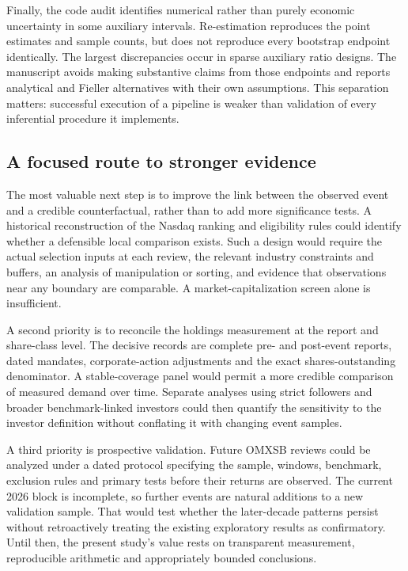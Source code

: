 Finally, the code audit identifies numerical rather than purely economic uncertainty in some auxiliary intervals. Re-estimation reproduces the point estimates and sample counts, but does not reproduce every bootstrap endpoint identically. The largest discrepancies occur in sparse auxiliary ratio designs. The manuscript avoids making substantive claims from those endpoints and reports analytical and Fieller alternatives with their own assumptions. This separation matters: successful execution of a pipeline is weaker than validation of every inferential procedure it implements.

\subsection{A focused route to stronger evidence}

The most valuable next step is to improve the link between the observed event and a credible counterfactual, rather than to add more significance tests. A historical reconstruction of the Nasdaq ranking and eligibility rules could identify whether a defensible local comparison exists. Such a design would require the actual selection inputs at each review, the relevant industry constraints and buffers, an analysis of manipulation or sorting, and evidence that observations near any boundary are comparable. A market-capitalization screen alone is insufficient.

A second priority is to reconcile the holdings measurement at the report and share-class level. The decisive records are complete pre- and post-event reports, dated mandates, corporate-action adjustments and the exact shares-outstanding denominator. A stable-coverage panel would permit a more credible comparison of measured demand over time. Separate analyses using strict followers and broader benchmark-linked investors could then quantify the sensitivity to the investor definition without conflating it with changing event samples.

A third priority is prospective validation. Future OMXSB reviews could be analyzed under a dated protocol specifying the sample, windows, benchmark, exclusion rules and primary tests before their returns are observed. The current 2026 block is incomplete, so further events are natural additions to a new validation sample. That would test whether the later-decade patterns persist without retroactively treating the existing exploratory results as confirmatory. Until then, the present study's value rests on transparent measurement, reproducible arithmetic and appropriately bounded conclusions.
